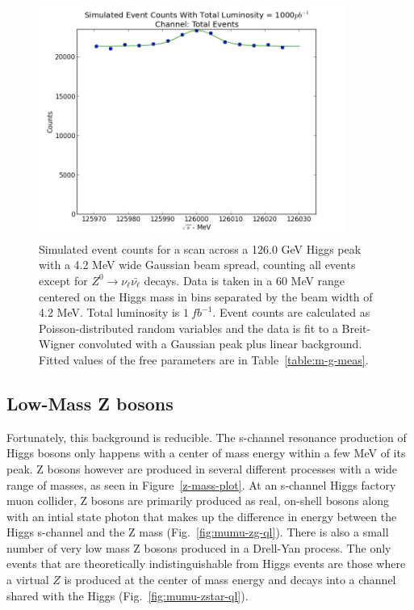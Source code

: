 \documentclass[a4paper]{article}
\begin{document}
\begin{figure}[h]
	\includegraphics[width=0.9\textwidth]{data-fit-total-raw}
	\caption{Simulated event counts for a scan across a 126.0 GeV Higgs peak with a 4.2 MeV wide Gaussian beam spread, counting all events except for $Z^0\rightarrow \nu_{\ell}\bar{\nu_{\ell}}$ decays. Data is taken in a 60 MeV range centered on the Higgs mass in bins separated by the beam width of 4.2 MeV. Total luminosity is $1~fb^{-1}$. Event counts are calculated as Poisson-distributed random variables and the data is fit to a Breit-Wigner convoluted with a Gaussian peak plus linear background. Fitted values of the free parameters are in Table~\ref{table:m-g-meas}.}
\label{data-fit-total-raw}
\end{figure}

	\subsection{Low-Mass Z bosons}
	Fortunately, this background is reducible. The s-channel resonance production of Higgs bosons only happens with a center of mass energy within a few MeV of its peak. Z bosons however are produced in several different processes with a wide range of masses, as seen in Figure~\ref{z-mass-plot}. At an s-channel Higgs factory muon collider, Z bosons are primarily produced as real, on-shell bosons along with an intial state photon that makes up the difference in energy between the Higgs s-channel and the Z mass (Fig.~\ref{fig:mumu-zg-ql}). There is also a small number of very low mass Z bosons produced in a Drell-Yan process. The only events that are theoretically indistinguishable from Higgs events are those where a virtual $Z$ is produced at the center of mass energy and decays into a channel shared with the Higgs (Fig.~\ref{fig:mumu-zstar-ql}).
\end{document}

